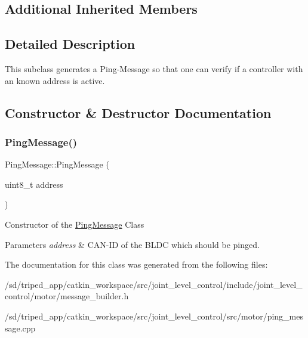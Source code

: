\subsection*{Additional Inherited Members}


\subsection{Detailed Description}
This subclass generates a Ping-\/\+Message so that one can verify if a controller with an known address is active. 

\subsection{Constructor \& Destructor Documentation}
\mbox{\label{classPingMessage_a67d49a8189b481cf1d39460a90ab5be7}} 
\subsubsection{\texorpdfstring{Ping\+Message()}{PingMessage()}}
{\footnotesize\ttfamily Ping\+Message\+::\+Ping\+Message (\begin{DoxyParamCaption}\item[{uint8\+\_\+t}]{address }\end{DoxyParamCaption})}

Constructor of the \hyperlink{classPingMessage}{Ping\+Message} Class 
\begin{DoxyParams}{Parameters}
{\em address} & C\+A\+N-\/\+ID of the B\+L\+DC which should be pinged. \\
\hline
\end{DoxyParams}


The documentation for this class was generated from the following files\+:\begin{DoxyCompactItemize}
\item 
/sd/triped\+\_\+app/catkin\+\_\+workspace/src/joint\+\_\+level\+\_\+control/include/joint\+\_\+level\+\_\+control/motor/message\+\_\+builder.\+h\item 
/sd/triped\+\_\+app/catkin\+\_\+workspace/src/joint\+\_\+level\+\_\+control/src/motor/ping\+\_\+message.\+cpp\end{DoxyCompactItemize}
